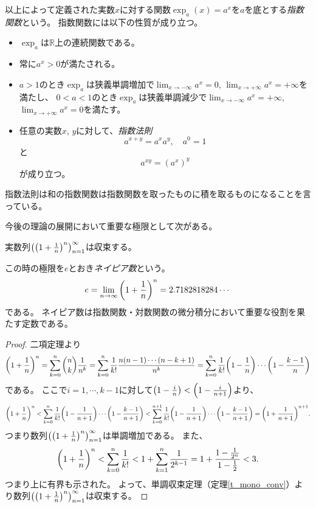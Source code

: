 以上によって定義された実数$x$に対する関数$\exp_a(x) = a^x$を$a$を底とする\emph{指数関数}という。
指数関数には以下の性質が成り立つ。
\begin{itemize}
\item
$\exp_a$は$\mathbb{R}$上の連続関数である。
\item
常に$a^x > 0$が満たされる。
\item
$a > 1$のとき$\exp_a$は狭義単調増加で$\lim_{x \to -\infty}a^x = 0$, $\lim_{x \to +\infty}a^x = +\infty$を満たし、
$0 < a < 1$のとき$\exp_a$は狭義単調減少で$\lim_{x \to -\infty}a^x = +\infty$, $\lim_{x \to +\infty}a^x = 0$を満たす。
\item
任意の実数$x$, $y$に対して、\emph{指数法則}
$$
a^{x+y} = a^x a^y, \quad a^0 = 1
$$
と
$$
a^{x y} = (a^x)^y
$$
が成り立つ。
\end{itemize}

指数法則は和の指数関数は指数関数を取ったものに積を取るものになることを言っている。

今後の理論の展開において重要な極限として次がある。

\begin{theorem}
実数列$\qty(\qty(1+\frac{1}{n})^n)_{n = 1}^\infty$は収束する。
\end{theorem}

この時の極限を$e$とおき\emph{ネイピア数}という。
$$
e = \lim_{n \to \infty}\qty(1+\frac{1}{n})^n = 2.7182818284\cdots
$$
である。
ネイピア数は指数関数・対数関数の微分積分において重要な役割を果たす定数である。

\begin{proof}
二項定理より
$$
\qty(1+\frac{1}{n})^n
= \sum_{k = 0}^n \binom{n}{k}\frac{1}{n^k}
= \sum_{k = 0}^n \frac{1}{k!}\frac{n(n-1)\cdots(n-k+1)}{n^k}
= \sum_{k = 0}^n \frac{1}{k!}\qty(1-\frac{1}{n})\cdots\qty(1-\frac{k-1}{n})
$$
である。
ここで$i = 1, \cdots, k-1$に対して$\qty(1-\frac{i}{n}) < \qty(1-\frac{i}{n+1})$より、
$$
\qty(1+\frac{1}{n})^n
< \sum_{k = 0}^n \frac{1}{k!}\qty(1-\frac{1}{n+1})\cdots\qty(1-\frac{k-1}{n+1})
< \sum_{k = 0}^{n+1} \frac{1}{k!}\qty(1-\frac{1}{n+1})\cdots\qty(1-\frac{k-1}{n+1})
= \qty(1+\frac{1}{n+1})^{n+1}.
$$
つまり数列$\qty(\qty(1+\frac{1}{n})^n)_{n = 1}^\infty$は単調増加である。
また、
$$
\qty(1+\frac{1}{n})^n < \sum_{k = 0}^n \frac{1}{k!} < 1+\sum_{k = 1}^n \frac{1}{2^{k-1}} = 1+\frac{1-\frac{1}{2^n}}{1-\frac{1}{2}} < 3.
$$
つまり上に有界も示された。
よって、単調収束定理（定理\ref{t_mono_conv}）より数列$\qty(\qty(1+\frac{1}{n})^n)_{n = 1}^\infty$は収束する。
\end{proof}

